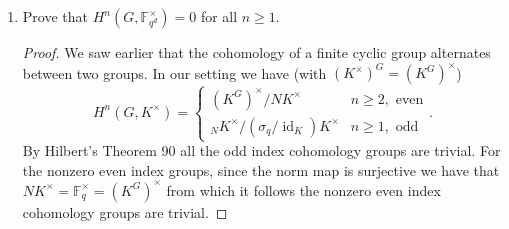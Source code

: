 \documentclass[11pt]{article}
\DeclareMathOperator{\id}{id}
\begin{document}
\begin{enumerate}
\begin{enumerate}
\begin{proof}
        Then by interpreting ${}_NK^\times$ as the kernel of the norm map of the cyclic groups $K^\times\to F^\times$ we have that the image of the norm map is a (cyclic) subgroup of order $q-1$ in $\mathbb{F}_q^\times$. But $\mathbb{F}_q^\times$ has order $q-1$ so the image of the norm map on all of $\mathbb{F}_{q^d}$ is exactly $\mathbb{F}_q$.
        \end{proof}
        \item Prove that $H^n(G,\mathbb{F}_{q^d}^\times) = 0$ for all $n\geq 1$. \begin{proof}
            We saw earlier that the cohomology of a finite cyclic group alternates between two groups. In our setting we have (with $(K^\times)^G = (K^G)^\times$) \[H^n(G,K^\times) = \begin{cases}
            (K^G)^\times/NK^\times & n\geq 2, \text{ even} \\
            {}_NK^\times/(\sigma_q/\id_K)K^\times & n\geq 1,\text{ odd}\end{cases}.\] By Hilbert's Theorem 90 all the odd index cohomology groups are trivial. For the nonzero even index groups, since the norm map is surjective we have that $NK^\times = \mathbb{F}_q^\times = (K^G)^\times$ from which it follows the nonzero even index cohomology groups are trivial.
        \end{proof}
    \end{enumerate}
\end{enumerate}
\end{document}
